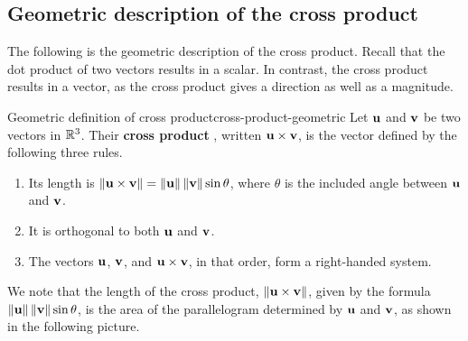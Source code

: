 \subsection{Geometric description of the cross product}

The following is the geometric description of the cross
product. Recall that the dot product of two vectors results in a
scalar. In contrast, the cross product results in a vector, as the
cross product gives a direction as well as a magnitude.%

\begin{definition}{Geometric definition of cross product}{cross-product-geometric}
  Let\/ $\vect{u}$ and $\vect{v}$ be two vectors in $\mathbb{R}^3$. Their
  \textbf{cross product}%
  , written $\vect{u}\times \vect{v}$, is the
  vector defined by the following three rules.%

  \begin{enumerate}
  \item Its length is $\norm{\vect{u}\times \vect{v}} =\norm{\vect{u}} \norm{
      \vect{v}} \sin \theta$,
    where $\theta $ is the included angle between $\vect{u}$ and $\vect{v}$.

  \item It is orthogonal to both $\vect{u}$ and $\vect{v}$.

  \item The vectors $\vect{u}$, $\vect{v}$, and $\vect{u}\times
    \vect{v}$, in that order, form a right-handed system.
  \end{enumerate}
\end{definition}

We note that the length of the cross product,
$\norm{\vect{u}\times\vect{v}}$, given by the formula
$\norm{\vect{u}}\norm{\vect{v}}\sin\theta$, is the area of the
parallelogram determined by $\vect{u}$ and $\vect{v}$, as shown in the
following picture.%
%
%
%
\begin{center}
\end{center}
